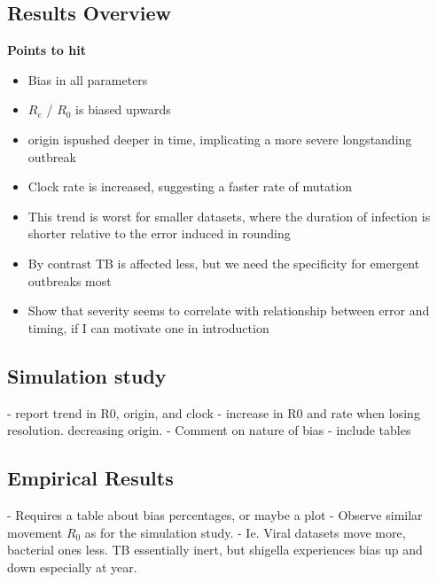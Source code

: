 \documentclass{article}
\begin{document}
\begin{spacing}{1.5}
\subsection*{Results Overview}
\textbf{Points to hit}
\begin{itemize}
    \item Bias in all parameters
    \item $R_e$ / $R_0$ is biased upwards
    \item origin ispushed deeper in time, implicating a more severe longstanding outbreak
    \item Clock rate is increased, suggesting a faster rate of mutation
    \item This trend is worst for smaller datasets, where the duration of infection is shorter relative to the error induced in rounding
    \item By contrast TB is affected less, but we need the specificity for emergent outbreaks most
    \item Show that severity seems to correlate with relationship between error and timing, if I can motivate one in introduction
\end{itemize}

\subsection*{Simulation study}
- report trend in R0, origin, and clock
- increase in R0 and rate when losing resolution. decreasing origin.
- Comment on nature of bias
- include tables

\subsection*{Empirical Results}
- Requires a table about bias percentages, or maybe a plot
- Observe similar movement $R_0$ as for the simulation study.
- Ie. Viral datasets move more, bacterial ones less. TB essentially inert, but shigella experiences bias up and down especially at year.


\end{spacing}
\end{document}
